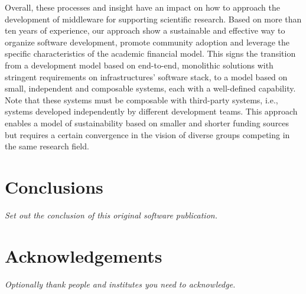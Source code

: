 \documentclass[preprint,12pt, a4paper]{elsarticle}
\begin{document}
Overall, these processes and insight have an impact on how to approach the
development of middleware for supporting scientific research. Based on more
than ten years of experience, our approach show a sustainable and effective
way to organize software development, promote community adoption and leverage
the specific characteristics of the academic financial model. This signs the
transition from a development model based on end-to-end, monolithic solutions
with stringent requirements on infrastructures' software stack, to a model
based on small, independent and composable systems, each with a well-defined
capability. Note that these systems must be composable with third-party
systems, i.e., systems developed independently by different development
teams. This approach enables a model of sustainability based on smaller and
shorter funding sources but requires a certain convergence in the vision of
diverse groups competing in the same research field.

\section{Conclusions}\label{sec:conclusions}

{\em Set out the conclusion of this original software publication.}


\section*{Acknowledgements}

{\em Optionally thank people and institutes you need to acknowledge. }




 

\end{document}
